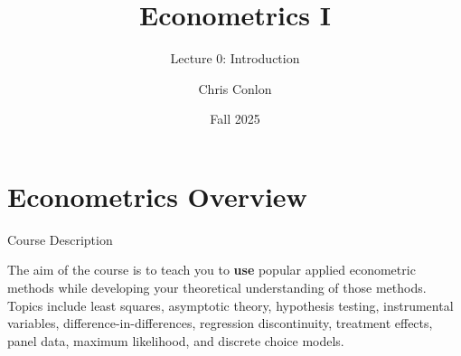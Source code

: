
















\title[L0 - Introduction]{ Econometrics I}
\subtitle{Lecture 0: Introduction}
\author{Chris Conlon}
\date{Fall 2025}
\maketitle

\section{Econometrics Overview}


\begin{frame}{Course Description}

\parbox{\linewidth}{
The aim of the course is to teach you to {\bf use} popular
applied econometric methods while developing your theoretical understanding
of those methods. Topics include least squares, asymptotic theory,
hypothesis testing, instrumental variables, difference-in-differences,
regression discontinuity, treatment effects, panel data, maximum likelihood, and
discrete choice models.
}

\end{frame}


